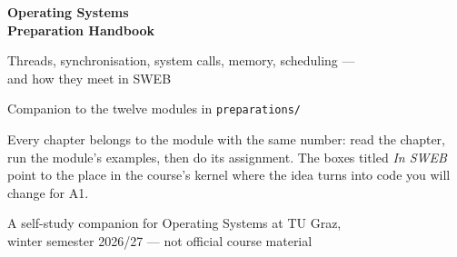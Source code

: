 \documentclass[11pt]{report}
\begin{document}
\begin{titlepage}
  \centering
  \vspace*{3cm}
  {\Huge\bfseries Operating Systems\\[6pt] Preparation Handbook\par}
  \vspace{1cm}
  {\Large Threads, synchronisation, system calls, memory, scheduling ---\\
   and how they meet in SWEB\par}
  \vspace{2cm}
  {\large Companion to the twelve modules in \texttt{preparations/}\par}
  \vfill
  \begin{infobox}
  Every chapter belongs to the module with the same number: read the
  chapter, run the module's examples, then do its assignment. The boxes
  titled \emph{In SWEB} point to the place in the course's kernel where the
  idea turns into code you will change for A1.
  \end{infobox}
  \vspace{1cm}
  {\small A self-study companion for Operating Systems at TU Graz,\\ winter semester 2026/27 --- not official course material\par}
\end{titlepage}

\tableofcontents

\setcounter{chapter}{-1}












\end{document}
